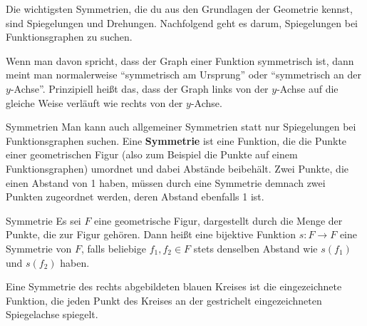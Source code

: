 \documentclass[../../main.tex]{subfiles}
\begin{document}
\label{sec:abbildungen_symmetrie}

Die wichtigsten Symmetrien, die du aus den Grundlagen der Geometrie kennst, sind Spiegelungen und Drehungen. Nachfolgend geht es darum, Spiegelungen bei Funktionsgraphen zu suchen.

Wenn man davon spricht, dass der Graph einer Funktion symmetrisch ist, dann meint man normalerweise \enquote{symmetrisch am Ursprung} oder \enquote{symmetrisch an der $y$-Achse}. Prinzipiell heißt das, dass der Graph links von der $y$-Achse auf die gleiche Weise verläuft wie rechts von der $y$-Achse.

\begin{advanced}{Symmetrien}
    Man kann auch allgemeiner Symmetrien statt nur Spiegelungen bei Funktionsgraphen suchen. Eine \textbf{Symmetrie} ist eine Funktion, die die Punkte einer geometrischen Figur (also zum Beispiel die Punkte auf einem Funktionsgraphen) umordnet und dabei Abstände beibehält. Zwei Punkte, die einen Abstand von 1 haben, müssen durch eine Symmetrie demnach zwei Punkten zugeordnet werden, deren Abstand ebenfalls 1 ist.
    
    \begin{definition}{Symmetrie}
        Es sei $F$ eine geometrische Figur, dargestellt durch die Menge der Punkte, die zur Figur gehören. Dann heißt eine bijektive Funktion $s\colon F\rightarrow F$ eine Symmetrie von $F$, falls beliebige $f_1,f_2\in F$ stets denselben Abstand wie $s(f_1)$ und $s(f_2)$ haben.
    \end{definition}
    
    \begin{example}{}
        Eine Symmetrie des rechts abgebildeten blauen Kreises ist die eingezeichnete Funktion, die jeden Punkt des Kreises an der gestrichelt eingezeichneten Spiegelachse spiegelt.
        

\end{example}
\end{advanced}
\end{document}
